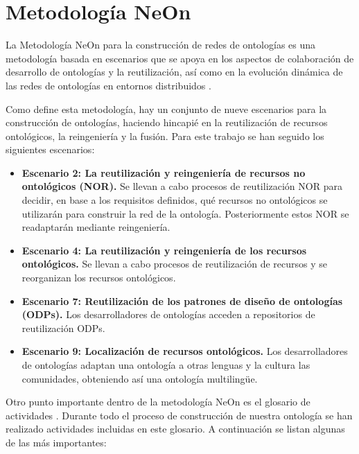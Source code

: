\documentclass[a4paper,12pt]{article}
\begin{document}
	\section{Metodología NeOn}
	
	La Metodología NeOn para la construcción de redes de ontologías es una metodología basada en
escenarios que se apoya en los aspectos de colaboración de desarrollo de ontologías y la
reutilización, así como en la evolución dinámica de las redes de ontologías en entornos
distribuidos
\cite{oeg-neon}.
	
	Como define esta metodología, hay un conjunto de nueve escenarios para la construcción de
ontologías, haciendo hincapié en la reutilización de recursos ontológicos, la reingeniería y la
fusión. Para este trabajo se han seguido los
siguientes escenarios:
	\begin{itemize}
		\item \textbf{Escenario 2: La reutilización y reingeniería de recursos no ontológicos (NOR).}
		Se llevan a cabo procesos de reutilización NOR para decidir, en base a los requisitos definidos, qué recursos no ontológicos se utilizarán para construir la red de la ontología. Posteriormente estos NOR se readaptarán mediante reingeniería.
		\item \textbf{Escenario 4: La reutilización y reingeniería de los recursos ontológicos.}
		Se llevan a cabo procesos de reutilización de recursos y se reorganizan los recursos ontológicos.
		\item \textbf{Escenario 7: Reutilización de los patrones de diseño de ontologías (ODPs).}
		Los desarrolladores de ontologías acceden a repositorios de reutilización ODPs.
		\item \textbf{Escenario 9: Localización de recursos ontológicos.}
		Los desarrolladores de ontologías adaptan una ontología a otras lenguas y la cultura las comunidades, obteniendo así una ontología multilingüe.
	\end{itemize}
	
	Otro punto importante dentro de la metodología NeOn es el glosario de actividades \cite{oeg-glossary}. Durante todo el proceso de construcción de
	nuestra ontología se han realizado actividades incluidas en este glosario. A continuación se listan
	algunas de las más importantes:
	
\end{document}

